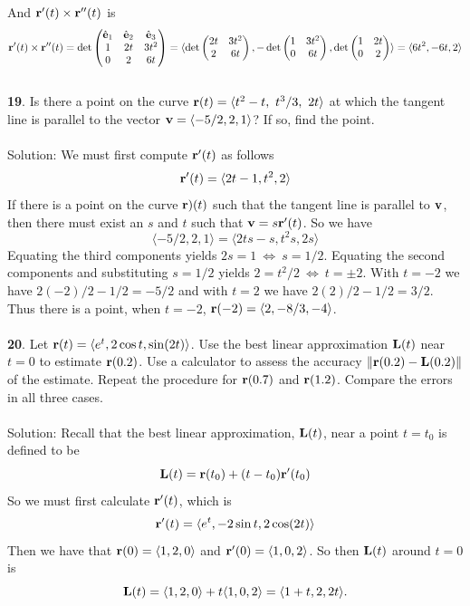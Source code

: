 \documentclass[12pt]{amsbook}
\newcommand{\la}{\langle}
\newcommand{\ra}{\rangle}
\begin{document}
And ${\bf r}'(t)\times {\bf r}''(t)$ is 
$${\bf r}'(t)\times {\bf r}''(t)=\det
\begin{pmatrix}
\hat{\bf e}_1 & \hat{\bf e}_2 & \hat{\bf e}_3\cr 1&2t&3t^2\cr 0&2&6t \end{pmatrix}=\la \det\begin{pmatrix}2t&3t^2\cr 2&6t  \end{pmatrix}, -\det\begin{pmatrix}1&3t^2\cr 0&6t  \end{pmatrix}, \det\begin{pmatrix}1&2t\cr 0&2 \end{pmatrix} \ra = \la 6t^2, -6t, 2 \ra$$
\\
{\small\bf 19}. Is there a point on the curve ${\bf r}(t)=\la t^2-t, \ t^3/3, \ 2t \ra$ at which the
tangent line is parallel to the vector ${\bf v} = \la-5/2, 2, 1\ra$? If so, find the point.
\\
\\
{\sc Solution}: We must first compute ${\bf r}'(t)$ as follows
$${\bf r}'(t)=\la 2t-1, t^2, 2\ra$$
If there is a point on the curve ${\bf r})(t)$ such that the tangent line is parallel to ${\bf v}$, then there must exist an $s$ and $t$ such that ${\bf v}=s{\bf r}'(t)$. So we have
$$\la -5/2,2,1\ra = \la 2ts-s, t^2s, 2s \ra$$
Equating the third components yields $2s = 1 \ \Leftrightarrow \ s=1/2$. Equating the second components and substituting $s=1/2$ yields $2=t^2/2 \ \Leftrightarrow \ t=\pm 2$. With $t=-2$ we have $2(-2)/2-1/2=-5/2$ and with $t=2$ we have $2(2)/2-1/2=3/2$. Thus there is a point, when $t=-2$, ${\bf r}(-2)=\la 2, -8/3, -4\ra$.  
\\
\\
{\small\bf 20}. Let ${\bf r}(t)=\la e^t, 2\cos t, \sin(2t) \ra$. Use the best linear approximation
${\bf L}(t)$ near $t = 0$ to estimate ${\bf r}(0.2)$. Use a calculator to assess the accuracy
$\|{\bf r}(0.2)-{\bf L}(0.2)\|$ of the estimate. Repeat the procedure for ${\bf r}(0.7)$ and ${\bf r}(1.2)$. Compare the errors in all three cases.
\\
\\
{\sc Solution}: Recall that the best linear approximation, ${\bf L}(t)$, near a point $t=t_0$ is defined to be
$${\bf L}(t)={\bf r}(t_0)+(t-t_0){\bf r}'(t_0)$$
So we must first calculate ${\bf r}'(t)$, which is
$${\bf r}'(t)=\la e^t, -2\sin t, 2\cos(2t)\ra$$
Then we have that ${\bf r}(0)=\la 1,2,0 \ra$ and ${\bf r}'(0)=\la 1,0,2\ra$. So then ${\bf L}(t)$ around $t=0$ is
$${\bf L}(t)=\la 1,2,0 \ra + t\la 1,0,2\ra= \la 1+t, 2, 2t \ra.$$
\end{document}
